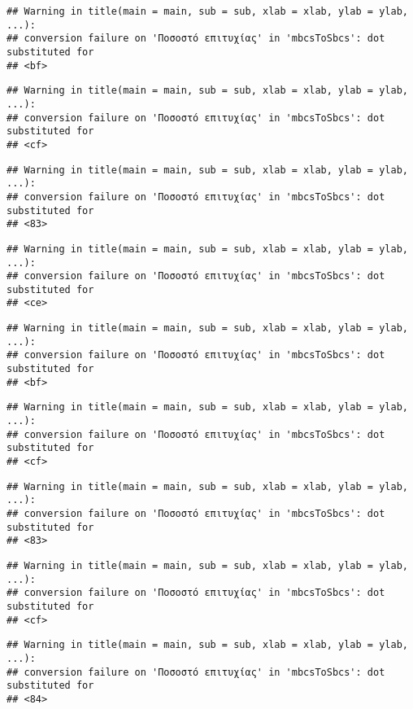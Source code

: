 \documentclass[
]{article}
\begin{document}
\begin{verbatim}
## Warning in title(main = main, sub = sub, xlab = xlab, ylab = ylab, ...):
## conversion failure on 'Ποσοστό επιτυχίας' in 'mbcsToSbcs': dot substituted for
## <bf>
\end{verbatim}

\begin{verbatim}
## Warning in title(main = main, sub = sub, xlab = xlab, ylab = ylab, ...):
## conversion failure on 'Ποσοστό επιτυχίας' in 'mbcsToSbcs': dot substituted for
## <cf>
\end{verbatim}

\begin{verbatim}
## Warning in title(main = main, sub = sub, xlab = xlab, ylab = ylab, ...):
## conversion failure on 'Ποσοστό επιτυχίας' in 'mbcsToSbcs': dot substituted for
## <83>
\end{verbatim}

\begin{verbatim}
## Warning in title(main = main, sub = sub, xlab = xlab, ylab = ylab, ...):
## conversion failure on 'Ποσοστό επιτυχίας' in 'mbcsToSbcs': dot substituted for
## <ce>
\end{verbatim}

\begin{verbatim}
## Warning in title(main = main, sub = sub, xlab = xlab, ylab = ylab, ...):
## conversion failure on 'Ποσοστό επιτυχίας' in 'mbcsToSbcs': dot substituted for
## <bf>
\end{verbatim}

\begin{verbatim}
## Warning in title(main = main, sub = sub, xlab = xlab, ylab = ylab, ...):
## conversion failure on 'Ποσοστό επιτυχίας' in 'mbcsToSbcs': dot substituted for
## <cf>
\end{verbatim}

\begin{verbatim}
## Warning in title(main = main, sub = sub, xlab = xlab, ylab = ylab, ...):
## conversion failure on 'Ποσοστό επιτυχίας' in 'mbcsToSbcs': dot substituted for
## <83>
\end{verbatim}

\begin{verbatim}
## Warning in title(main = main, sub = sub, xlab = xlab, ylab = ylab, ...):
## conversion failure on 'Ποσοστό επιτυχίας' in 'mbcsToSbcs': dot substituted for
## <cf>
\end{verbatim}

\begin{verbatim}
## Warning in title(main = main, sub = sub, xlab = xlab, ylab = ylab, ...):
## conversion failure on 'Ποσοστό επιτυχίας' in 'mbcsToSbcs': dot substituted for
## <84>
\end{verbatim}
\end{document}
